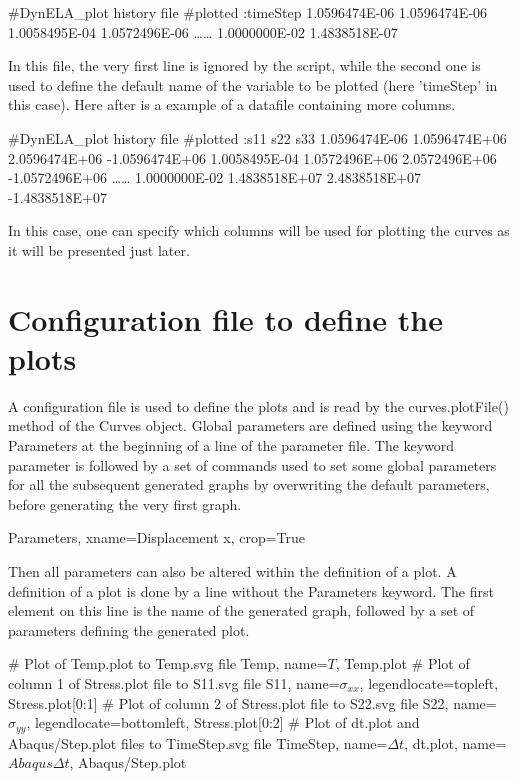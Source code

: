 \begin{PythonListing}
#DynELA_plot history file
#plotted :timeStep 
1.0596474E-06 1.0596474E-06 
1.0058495E-04 1.0572496E-06 
\ldots\ldots
1.0000000E-02 1.4838518E-07 
\end{PythonListing}

In this file, the very first line is ignored by the script, while the second one is used to define the default name of the variable to be plotted (here 'timeStep' in this case). Here after is a example of a datafile containing more columns.

\begin{PythonListing}
#DynELA_plot history file
#plotted :s11 s22 s33 
1.0596474E-06 1.0596474E+06 2.0596474E+06 -1.0596474E+06 
1.0058495E-04 1.0572496E+06 2.0572496E+06 -1.0572496E+06 
\ldots\ldots
1.0000000E-02 1.4838518E+07 2.4838518E+07 -1.4838518E+07 
\end{PythonListing}

In this case, one can specify which columns will be used for plotting the curves as it will be presented just later.

\section{Configuration file to define the plots}

A configuration file is used to define the plots and is read by the \textsf{curves.plotFile()} method of the Curves object. Global parameters are defined using the keyword \textsf{Parameters} at the beginning of a line of the parameter file. The keyword parameter is followed by a set of commands used to set some global parameters for all the subsequent generated graphs by overwriting the default parameters, before generating the very first graph.

\begin{PythonListing}
Parameters, xname=Displacement x, crop=True
\end{PythonListing}

Then all parameters can also be altered within the definition of a plot. A definition of a plot is done by a line without the \textsf{Parameters} keyword. The first element on this line is the name of the generated graph, followed by a set of parameters defining the generated plot.

\begin{PythonListing}
# Plot of Temp.plot to Temp.svg file
Temp, name=$T$, Temp.plot
# Plot of column 1 of Stress.plot file to S11.svg file
S11, name=$\sigma_{xx}$, legendlocate=topleft, Stress.plot[0:1]
# Plot of column 2 of Stress.plot file to S22.svg file
S22, name=$\sigma_{yy}$, legendlocate=bottomleft, Stress.plot[0:2]
# Plot of dt.plot and Abaqus/Step.plot files to TimeStep.svg file
TimeStep, name=$\Delta t$, dt.plot, name=$Abaqus \Delta t$, Abaqus/Step.plot
\end{PythonListing}


